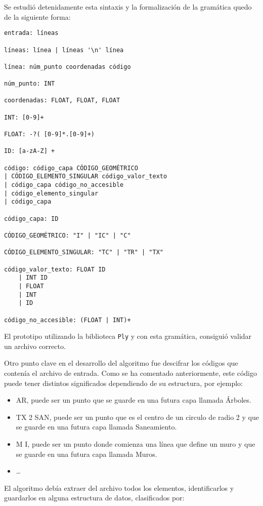 Se estudió detenidamente esta sintaxis y la formalización de la gramática quedo de la siguiente forma:

\begin{verbatim}
entrada: líneas

líneas: línea | líneas '\n' línea

línea: núm_punto coordenadas código

núm_punto: INT

coordenadas: FLOAT, FLOAT, FLOAT

INT: [0-9]+

FLOAT: -?( [0-9]*.[0-9]+)

ID: [a-zA-Z] +

código: código_capa CÓDIGO_GEOMÉTRICO
| CÓDIGO_ELEMENTO_SINGULAR código_valor_texto
| código_capa código_no_accesible
| código_elemento_singular
| código_capa

código_capa: ID

CÓDIGO_GEOMÉTRICO: "I" | "IC" | "C"

CÓDIGO_ELEMENTO_SINGULAR: "TC" | "TR" | "TX"

código_valor_texto: FLOAT ID
    | INT ID
    | FLOAT
    | INT
    | ID
    
código_no_accesible: (FLOAT | INT)+
\end{verbatim}

El prototipo utilizando la biblioteca \texttt{Ply} y con esta gramática,  consiguió validar un archivo correcto.

Otro punto clave en el desarrollo del algoritmo fue descifrar los códigos que contenía el archivo de entrada. Como se ha comentado anteriormente, este código puede tener distintos significados dependiendo de su estructura, por ejemplo:

\begin{itemize}
\item AR, puede ser un punto que se guarde en una futura capa llamada Árboles.
\item TX 2 SAN, puede ser un punto que es el centro de un circulo de radio 2 y que se guarde en una futura capa llamada Saneamiento.
\item M I, puede ser un punto donde comienza una línea que define un muro y que se guarde en una futura capa llamada Muros.
\item …
\end{itemize}

El algoritmo debía extraer del archivo todos los elementos, identificarlos y guardarlos en alguna estructura de datos, clasificados por:

